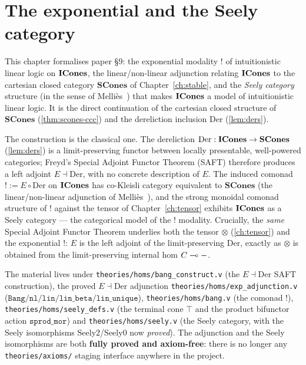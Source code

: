 \chapter{The exponential and the Seely category}\label{ch:exponential}

This chapter formalises paper \S9: the exponential modality
$\mathord{!}$ of intuitionistic linear logic on $\mathbf{ICones}$, the
linear/non-linear adjunction relating $\mathbf{ICones}$ to the cartesian closed
category $\mathbf{SCones}$ of Chapter~\ref{ch:stable}, and the
\emph{Seely category} structure (in the sense of
Melli\`es~\cite{mellies-categorical-semantics}) that makes $\mathbf{ICones}$ a
model of intuitionistic linear logic. It is the direct continuation of
the cartesian closed structure of $\mathbf{SCones}$
(\autoref{thm:scones-ccc}) and the dereliction inclusion $\mathrm{Der}$
(\autoref{lem:ders}).

The construction is the classical one. The dereliction
$\mathrm{Der} : \mathbf{ICones} \to \mathbf{SCones}$ (\autoref{lem:ders}) is a
limit-preserving functor between locally presentable, well-powered
categories; Freyd's Special Adjoint Functor Theorem (SAFT) therefore
produces a left adjoint $E \dashv \mathrm{Der}$, with no concrete
description of $E$. The induced comonad $\mathord{!} := E \circ
\mathrm{Der}$ on $\mathbf{ICones}$ has co-Kleisli category equivalent to
$\mathbf{SCones}$ (the linear/non-linear adjunction of
Melli\`es~\cite{mellies-categorical-semantics}), and the strong
monoidal comonad structure of $\mathord{!}$ against the tensor of
Chapter~\ref{ch:tensor} exhibits $\mathbf{ICones}$ as a Seely category --- the
categorical model of the $\mathord{!}$ modality. Crucially, the
\emph{same} Special Adjoint Functor Theorem underlies both the tensor
$\otimes$ (\autoref{ch:tensor}) and the exponential $\mathord{!}$: $E$
is the left adjoint of the limit-preserving $\mathrm{Der}$, exactly as
$\otimes$ is obtained from the limit-preserving internal hom $C \multimap -$.

The material lives under \texttt{theories/homs/bang\_construct.v} (the
$E \dashv \mathrm{Der}$ SAFT construction), the proved $E \dashv
\mathrm{Der}$ adjunction \texttt{theories/homs/exp\_adjunction.v}
($\texttt{Bang}/\texttt{nl}/\texttt{lin}/\texttt{lin\_beta}/\texttt{lin\_unique}$),
\texttt{theories/homs/bang.v} (the comonad $\mathord{!}$),
\texttt{theories/homs/seely\_defs.v} (the terminal cone $\top$ and the
product bifunctor action $\texttt{sprod\_mor}$) and
\texttt{theories/homs/seely.v} (the Seely category, with the Seely
isomorphisms $\mathrm{Seely2}$/$\mathrm{Seely0}$ now \emph{proved}). The
adjunction and the Seely isomorphisms are both \textbf{fully proved and
axiom-free}: there is no longer any \texttt{theories/axioms/} staging
interface anywhere in the project.

